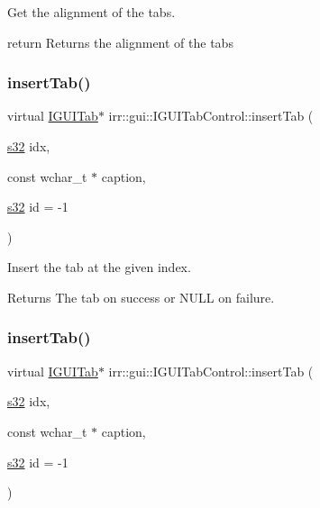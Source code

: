 Get the alignment of the tabs. 

return Returns the alignment of the tabs \mbox{\label{classirr_1_1gui_1_1IGUITabControl_a7ee37817344a547a240b751e3386b85b}} 
\subsubsection{\texorpdfstring{insert\+Tab()}{insertTab()}\hspace{0.1cm}{\footnotesize\ttfamily [1/2]}}
{\footnotesize\ttfamily virtual \hyperlink{classirr_1_1gui_1_1IGUITab}{I\+G\+U\+I\+Tab}$\ast$ irr\+::gui\+::\+I\+G\+U\+I\+Tab\+Control\+::insert\+Tab (\begin{DoxyParamCaption}\item[{\hyperlink{namespaceirr_ac66849b7a6ed16e30ebede579f9b47c6}{s32}}]{idx,  }\item[{const wchar\+\_\+t $\ast$}]{caption,  }\item[{\hyperlink{namespaceirr_ac66849b7a6ed16e30ebede579f9b47c6}{s32}}]{id = {\ttfamily -\/1} }\end{DoxyParamCaption})\hspace{0.3cm}{\ttfamily [pure virtual]}}



Insert the tab at the given index. 

\begin{DoxyReturn}{Returns}
The tab on success or N\+U\+LL on failure. 
\end{DoxyReturn}
\mbox{\label{classirr_1_1gui_1_1IGUITabControl_a7ee37817344a547a240b751e3386b85b}} 
\subsubsection{\texorpdfstring{insert\+Tab()}{insertTab()}\hspace{0.1cm}{\footnotesize\ttfamily [2/2]}}
{\footnotesize\ttfamily virtual \hyperlink{classirr_1_1gui_1_1IGUITab}{I\+G\+U\+I\+Tab}$\ast$ irr\+::gui\+::\+I\+G\+U\+I\+Tab\+Control\+::insert\+Tab (\begin{DoxyParamCaption}\item[{\hyperlink{namespaceirr_ac66849b7a6ed16e30ebede579f9b47c6}{s32}}]{idx,  }\item[{const wchar\+\_\+t $\ast$}]{caption,  }\item[{\hyperlink{namespaceirr_ac66849b7a6ed16e30ebede579f9b47c6}{s32}}]{id = {\ttfamily -\/1} }\end{DoxyParamCaption})\hspace{0.3cm}{\ttfamily [pure virtual]}}




